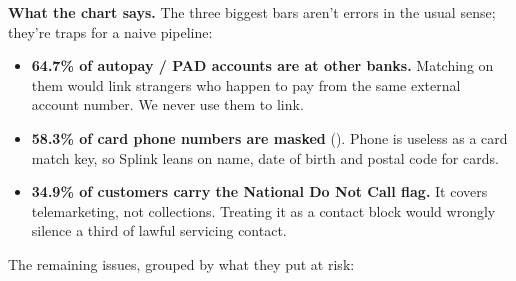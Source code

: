 \documentclass[11pt]{article}
\begin{document}

\textbf{What the chart says.} The three biggest bars aren't errors in the usual sense; they're traps for a naive pipeline:

\begin{itemize}
\item \textbf{64.7\% of autopay / PAD accounts are at other banks.} Matching on them would link strangers who happen to
pay from the same external account number. We never use them to link.
\item \textbf{58.3\% of card phone numbers are masked} (). Phone is useless as a card match key, so
Splink leans on name, date of birth and postal code for cards.
\item \textbf{34.9\% of customers carry the National Do Not Call flag.} It covers telemarketing, not collections. Treating
it as a contact block would wrongly silence a third of lawful servicing contact.
\end{itemize}

The remaining issues, grouped by what they put at risk:
\end{document}
